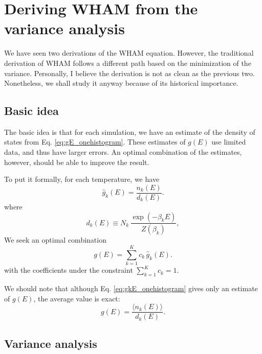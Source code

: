 \documentclass[aip,jcp,preprint,superscriptaddress]{revtex4-1}
\begin{document}
\section{\label{sec:WHAM_var}
Deriving WHAM from the variance analysis}




We have seen two derivations of the WHAM equation.
%
However, the traditional derivation of WHAM\cite{
ferrenberg1988, *ferrenberg1989, kumar1992,
newman, frenkel}
follows a different path
based on the minimization of the variance.
%
Personally,
I believe the derivation
is not as clean as the previous two.
%
Nonetheless,
we shall study it anyway
because of its historical importance.



\subsection{Basic idea}


The basic idea is that
for each simulation,
we have an estimate of the density of states
from Eq. \eqref{eq:gE_onehistogram}.
%
These estimates of $g(E)$
use limited data, and thus have larger errors.
%
An optimal combination of the estimates, however,
should be able to improve the result.


To put it formally,
for each temperature, we have
%
\begin{equation}
\hat g_k(E)
=
\frac{ n_k(E) }
     { d_k(E) }.
\label{eq:gkE_onehistogram}
\end{equation}
where
\begin{equation}
  d_k(E) \equiv N_k \, \frac{ \exp(-\beta_k E) } { Z(\beta_k) },
  \label{eq:dkE_def}
\end{equation}
%
We seek an optimal combination
%
\begin{equation}
g(E)
=
\sum_{k = 1}^K c_k \, \hat g_k(E).
\end{equation}
with the coefficients
under the constraint
$\sum_{k = 1}^K c_k = 1$.


We should note that
although Eq. \eqref{eq:gkE_onehistogram}
gives only an estimate of $g(E)$,
the average value is exact:
\begin{equation}
g(E)
=
\frac{ \langle n_k(E) \rangle}
     { d_k(E) }.
\label{eq:gkE_ave}
\end{equation}



\subsection{Variance analysis}
\end{document}

